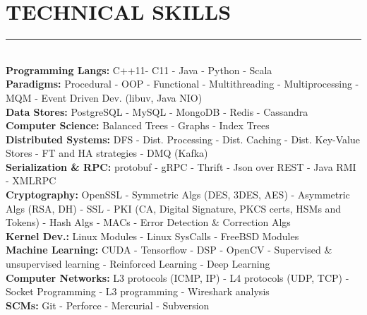 \documentclass[10pt,a4paper]{article}
\begin{document}
\section{TECHNICAL SKILLS}
\noindent \rule {4.8cm}{0.4pt} \\
\noindent
\textbullet \hspace{0.1cm}\textbf{Programming Langs:} C++11- C11 - Java - Python - Scala \\
\textbullet \hspace{0.1cm}\textbf{Paradigms:} Procedural - OOP - Functional - Multithreading - Multiprocessing - MQM - Event Driven Dev. (libuv, Java NIO) \\
\textbullet \hspace{0.1cm}\textbf{Data Stores:} PostgreSQL - MySQL - MongoDB - Redis - Cassandra \\
\textbullet \hspace{0.1cm}\textbf{Computer Science:} Balanced Trees - Graphs - Index Trees \\
\textbullet \hspace{0.1cm}\textbf{Distributed Systems:} DFS - Dist. Processing - Dist. Caching - Dist. Key-Value Stores - FT and HA strategies - DMQ (Kafka) \\
\textbullet \hspace{0.1cm}\textbf{Serialization \& RPC:} protobuf - gRPC - Thrift - Json over REST - Java RMI - XMLRPC \\
\textbullet \hspace{0.1cm}\textbf{Cryptography:} OpenSSL - Symmetric Algs (DES, 3DES, AES) - Asymmetric Algs (RSA, DH) - SSL - PKI (CA, Digital Signature, PKCS certs, HSMs and Tokens) - Hash Algs - MACs - Error Detection \& Correction Algs \\ 
\textbullet \hspace{0.1cm}\textbf{Kernel Dev.:} Linux Modules - Linux SysCalls - FreeBSD Modules \\
\textbullet \hspace{0.1cm}\textbf{Machine Learning:} CUDA - Tensorflow - DSP - OpenCV - Supervised \& unsupervised learning - Reinforced Learning - Deep Learning \\
\textbullet \hspace{0.1cm}\textbf{Computer Networks:} L3 protocols (ICMP, IP) - L4 protocols (UDP, TCP) - Socket Programming - L3 programming - Wireshark analysis \\
\textbullet \hspace{0.1cm}\textbf{SCMs:} Git - Perforce - Mercurial - Subversion \\
\end{document}
